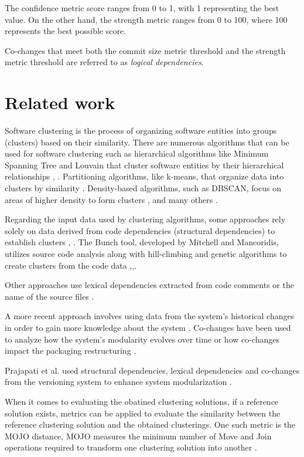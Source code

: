 \documentclass[conference]{IEEEtran}
\begin{document}
The confidence metric score ranges from 0 to 1, with 1 representing the best value. On the other hand, the strength metric ranges from 0 to 100, where 100 represents the best possible score.

Co-changes that meet both the commit size metric threshold and the strength metric threshold are referred to as \textit{logical dependencies}.

\section{Related work}


Software clustering is the process of organizing software entities into groups (clusters) based on their similarity. There are numerous algorithms that can be used for software clustering such as hierarchical algorithms like Minimum Spanning Tree and Louvain that cluster software entities by their hierarchical relationships \cite{hicluster}, \cite{SoraSem13}. Partitioning algorithms, like k-means, that organize data into clusters by similarity \cite{5453745}. Density-based algorithms, such as DBSCAN, focus on areas of higher density to form clusters \cite{10.1145/304181.304187}, and many others \cite{Xu2015ACS}. 


Regarding the input data used by clustering algorithms, some approaches rely solely on data derived from code dependencies (structural dependencies) to establish clusters \cite{SoraSem13}, \cite{891477}. The Bunch tool, developed by Mitchell and Mancoridis, utilizes source code analysis along with hill-climbing and genetic algorithms to create clusters from the code data \cite{Bunch1},\cite{Bunch2},\cite{Bunch3}.

Other approaches use lexical dependencies extracted from code comments \cite{5741257} or the name of the source files \cite{Anquetil1999RecoveringSA} \cite{Anquetil1998RecoveringSA}. 

A more recent approach involves using data from the system's historical changes in order to gain more knowledge about the system \cite{article-cochangem}. Co-changes have been used to analyze how the system's modularity evolves over time \cite{10.1145/3196398.3196409} or how co-changes impact the packaging restructuring \cite{clusters-cochange}.

Prajapati et al. used structural dependencies, lexical dependencies and co-changes from the versioning system to enhance system modularization \cite{clustering-ld-lexical}.

When it comes to evaluating the obatined clustering solutions,  if a reference solution exists, metrics can be applied to evaluate the similarity between the reference clustering solution and the obtained clusterings. One such metric is the MOJO distance, MOJO measures the minimum number of Move and Join operations required to transform one clustering solution into another \cite{mojo-tzerpos}. 
\end{document}
